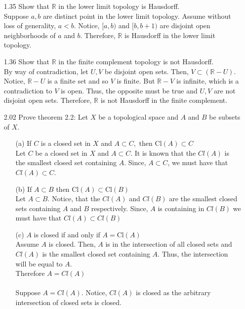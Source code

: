 \documentclass[12pt]{article}
\newcommand{\R}{\mathds{R}}
\begin{document}
\begin{enumerate}
\begin{enumerate}
		\end{enumerate}
	\item[1.35] Show that $\mathbb { R }$ in the lower limit topology is Hausdorff.\\
		Suppose $ a,b $ are distinct point in the lower limit topology. Assume without loss of generality, $ a<b $. Notice, $ [a,b) $ and $ [b,b+1) $ are disjoint open neighborhoods of $ a $ and $ b $. Therefore, $\R$ is Hausdorff in the lower limit topology.
	\item[1.36] Show that $\mathbb { R }$ in the finite complement topology is not Hausdorff.\\
		By way of contradiction, let $ U,V $ be disjoint open sets. Then, $ V \subset (\R-U) $. Notice, $ \R -U $ is a finite set and so $ V $ is finite. But $ \R-V $ is infinite, which is a contradiction to $ V $ is open. Thus, the opposite must be true and $ U,V $ are not disjoint open sets. Therefore, $ \R $ is not Hausdorff in the finite complement.
	\item[2.02] Prove theorem 2.2: Let $ X $ be a topological space and $ A $ and $ B $ be subsets of $ X $.
		\begin{enumerate}
			\item[(a)]If $C$ is a closed set in $X$ and $A \subset C ,$ then $\mathrm { Cl } ( A ) \subset C$\\
				Let $ C $ be a closed set in $ X $ and $ A\subset C $. It is known that the $ Cl(A) $ is the smallest closed set containing $ A $. Since, $ A \subset C $, we must have that $ Cl(A) \subset C $.
			\item[(b)] If $A \subset B$ then $\mathrm { Cl } ( A ) \subset \mathrm { Cl } ( B )$\\
				Let $ A \subset B $. Notice, that the $ Cl(A) $ and $ Cl(B) $ are the smallest closed sets containing $ A $ and $ B $ respectively. Since, $ A $ is containing in $ Cl(B) $ we must have that $ Cl(A)\subset Cl(B)$
			\item[(c)] $A$ is closed if and only if $A = \mathrm { Cl } ( A )$\\
				Assume $ A $ is closed. Then, $ A $ is in the intersection of all closed sets and $ Cl(A) $ is the smallest closed set containing $ A $. Thus, the intersection will be equal to $ A $. \\
				Therefore $ A=Cl(A) $ \\
				\\
				Suppose $ A=Cl(A) $. Notice, $ Cl(A) $ is closed as the arbitrary intersection of closed sets is closed. \\

\end{enumerate}
\end{enumerate}
\end{document}
